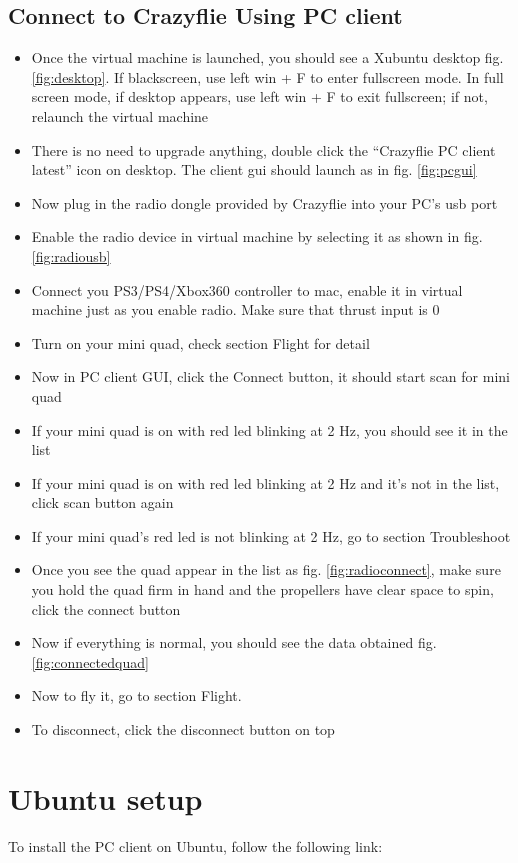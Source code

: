 \documentclass[11pt]{article}
\begin{document}
\subsection{Connect to Crazyflie Using PC client}
\begin{itemize}
\item Once the virtual machine is launched, you should see a Xubuntu desktop fig. \ref{fig:desktop}. If blackscreen, use left win + F to enter fullscreen mode. In full screen mode, if desktop appears, use left win + F to exit fullscreen; if not, relaunch the virtual machine
\item There is no need to upgrade anything, double click the ``Crazyflie PC client latest'' icon on desktop. The client gui should launch as in fig. \ref{fig:pcgui}
\item Now plug in the radio dongle provided by Crazyflie into your PC's usb port
\item Enable the radio device in virtual machine by selecting it as shown in fig. \ref{fig:radiousb}
\item Connect you PS3/PS4/Xbox360 controller to mac, enable it in virtual machine just as you enable radio. Make sure that thrust input is 0
\item Turn on your mini quad, check section Flight for detail
\item Now in PC client GUI, click the Connect button, it should start scan for mini quad
\item If your mini quad is on with red led blinking at 2 Hz, you should see it in the list
\item If your mini quad is on with red led blinking at 2 Hz and it's not in the list, click scan button again
\item If your mini quad's red led is not blinking at 2 Hz, go to section Troubleshoot 
\item Once you see the quad appear in the list as fig. \ref{fig:radioconnect}, make sure you hold the quad firm in hand and the propellers have clear space to spin, click the connect button
\item Now if everything is normal, you should see the data obtained fig. \ref{fig:connectedquad}
\item Now to fly it, go to section Flight.
\item To disconnect, click the disconnect button on top
\end{itemize}



\section{Ubuntu setup}
To install the PC client on Ubuntu, follow the following link: 
\end{document}
